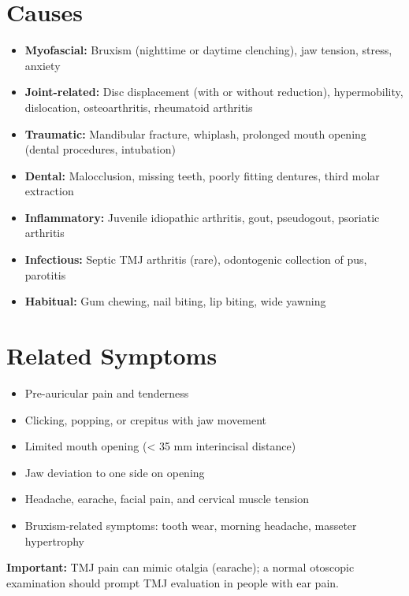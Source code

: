 \section*{Causes}
\begin{itemize}
  \item \textbf{Myofascial:} Bruxism (nighttime or daytime clenching), jaw tension, stress, anxiety
  \item \textbf{Joint-related:} Disc displacement (with or without reduction), hypermobility, dislocation, osteoarthritis, rheumatoid arthritis
  \item \textbf{Traumatic:} Mandibular fracture, whiplash, prolonged mouth opening (dental procedures, intubation)
  \item \textbf{Dental:} Malocclusion, missing teeth, poorly fitting dentures, third molar extraction
  \item \textbf{Inflammatory:} Juvenile idiopathic arthritis, gout, pseudogout, psoriatic arthritis
  \item \textbf{Infectious:} Septic TMJ arthritis (rare), odontogenic collection of pus, parotitis
  \item \textbf{Habitual:} Gum chewing, nail biting, lip biting, wide yawning
\end{itemize}

\section*{Related Symptoms}
\begin{itemize}
  \item Pre-auricular pain and tenderness
  \item Clicking, popping, or crepitus with jaw movement
  \item Limited mouth opening (< 35 mm interincisal distance)
  \item Jaw deviation to one side on opening
  \item Headache, earache, facial pain, and cervical muscle tension
  \item Bruxism-related symptoms: tooth wear, morning headache, masseter hypertrophy
\end{itemize}
\textbf{Important:} TMJ pain can mimic otalgia (earache); a normal otoscopic examination should prompt TMJ evaluation in people with ear pain.

